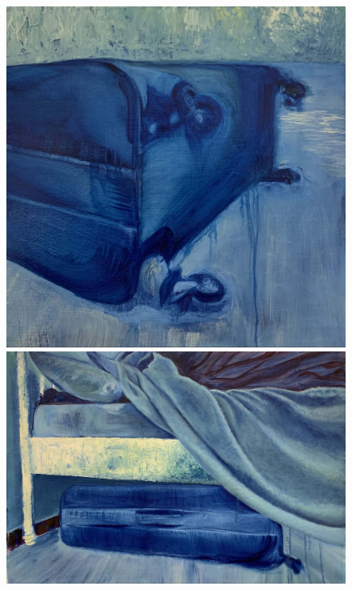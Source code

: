 \begin{figure}
  \begin{minipage}[b]{.3\linewidth}
  \caption{.}\label{rolamento-suspenso}

  \includegraphics[width =.88\linewidth]{figuras/boudet-rolamento-suspenso-20201.pdf.compressed.pdf}
\end{minipage}\hfill
\begin{minipage}[b]{.3\linewidth}
  \caption{.}\label{under-the-bed}
	\includegraphics[width = \linewidth]{figuras/boudet-under-the-bed-2021.pdf.compressed.pdf}
\end{minipage}\hfill
\begin{minipage}[b]{.25\linewidth}
  \caption{}\label{retrato-na-parede}


\end{minipage}
\end{figure}
